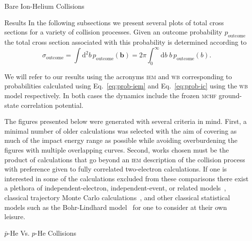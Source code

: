 \documentclass[letterpaper, 11 pt]{report}
\begin{document}
\begin{chapter}{Bare Ion-Helium Collisions \label{chap:p-he2p-he}}
\begin{section}{Results \label{sec:phe2p-res}}
      In the following subsections we present several plots of total cross sections for a variety of
      collision processes. Given an outcome probability $p_\mathrm{outcome}$ the total cross section
      associated with this probability is determined according to
      \begin{equation} \label{eq:tcs}
         \sigma_\mathrm{outcome} = \int \mathrm{d}^2 b \, p_\mathrm{outcome} (\mathbf{b})
         = 2 \pi \int^\infty_0 \mathrm{d}b \; b \, p_\mathrm{outcome} (b).
      \end{equation}

      We will refer to our results using the acronyms \textsc{iem} and \textsc{wb} corresponding to
      probabilities calculated using Eq.~\eqref{eq:prob-iem} and Eq.~\eqref{eq:prob-ic} using the
      \textsc{wb} model respectively. In both cases the dynamics include the frozen \textsc{mchf}
      ground-state correlation potential.

      The figures presented below were generated with several criteria in mind. First, a minimal number
      of older calculations was selected with the aim of covering as much of the impact energy range as
      possible while avoiding overburdening the figures with multiple overlapping curves. Second, works
      chosen must be the product of calculations that go beyond an \textsc{iem} description of the
      collision process with preference given to fully correlated two-electron calculations. If one is
      interested in some of the calculations excluded from these comparisons there exist a plethora of
      independent-electron, independent-event, or related models~\cite{SLD-83, DMR-84, SLD-85, GM-86,
      CM-87, GM-87, JLF-89, DC-90, DC-91a, DC-91b, DG-91, SKG-91, SL-91, Kuang-92, MLC-93, CM-94,
      CSR-95, BDM-96, MBGH-97, McCartney-97, McCartney-99, GAMRF-02, GFS-02, AMRF-04, BLMC-04, FRBJG-06,
      FJG-07, GIFK-08, ZK-09, G-11, LFG-11, GG-12a}, classical trajectory Monte Carlo
      calculations~\cite{ZM-85, OWM-86, MO-87, WO-88, MS-89, Cohen-96, TH-96, MMTH-02, DAKW-04, GEP-09},
      and other classical statistical models such as the Bohr-Lindhard model~\cite{DYC-08,Ding-12} for
      one to consider at their own leisure.

      \begin{subsection}{ \texorpdfstring{$\bar{p}$}{pbar}-He Vs. \texorpdfstring{$p$}{p}-He Collisions
                         \label{sec:pbarhe-res}}


\end{subsection}
\end{section}
\end{chapter}
\end{document}
